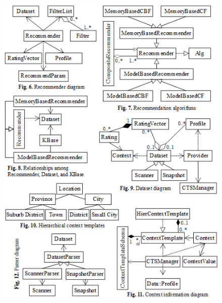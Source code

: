 \documentclass[a4paper]{llncs}
\begin{document}
\begin{figure}
\centering
\includegraphics{MultiFigures-3.png}
\end{figure}
\end{document}
